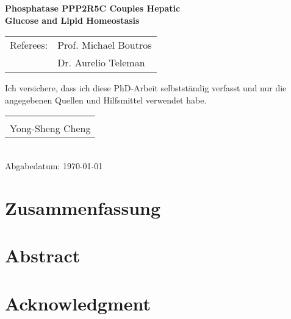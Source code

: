 \documentclass[
     12pt,         %
     a4paper,      %
     BCOR10mm,     %
     DIV14,        %
     listof=totoc,   %
     bibliography=totoc,     %
     index=totoc,     %
     ]{scrreprt}   %
\makeatletter
\newcommand{\sign}[1]{%
  \begin{tabular}[t]{@{}l@{}}
  \makebox[2in]{\hrulefill}\\
  \strut#1\strut
  \end{tabular}%
}
\newcommand{\blankpage}{
\newpage
\thispagestyle{empty}
\mbox{}
\addtocounter{page}{-1}%
\newpage
}
\makeatother
\begin{document}
\begin{titlepage}
\begin{center}
\vspace{0.5\baselineskip}
{\Large \textbf{
Phosphatase PPP2R5C Couples Hepatic\\
\vspace{0.5cm}
Glucose and Lipid Homeostasis}
}

\vfill 
{\large
\begin{tabular}[l]{ll}
Referees: & Prof. Michael Boutros\\
          & Dr. Aurelio Teleman\\
\end{tabular}
}
\end{center}

\end{titlepage}

\blankpage


\onehalfspacing


\vspace*{100pt}
Ich versichere, dass ich diese PhD-Arbeit selbstständig verfasst und nur die angegebenen
Quellen und Hilfsmittel verwendet habe.

\vspace*{50pt}

\sign{Yong-Sheng Cheng}\\
Abgabedatum: \today

\blankpage

\chapter*{Zusammenfassung}


\blankpage

\chapter*{Abstract}


\blankpage

\chapter*{Acknowledgment}


\blankpage

\tableofcontents
\cleardoublepage
\end{document}
